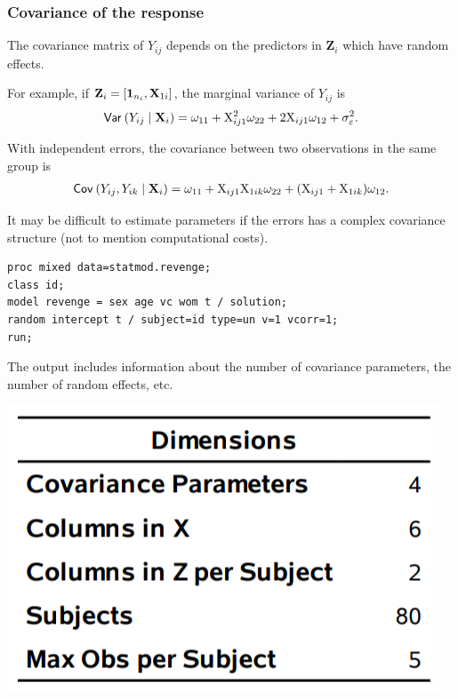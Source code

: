 \documentclass{beamer}
\begin{document}
\begin{frame}
\frametitle{Covariance of the response}
\bi
\item The covariance matrix of $Y_{ij}$ depends on the predictors in $\mathbf{Z}_i$ which have random effects.
\item For example, if $\mathbf{Z}_{i} = [\boldsymbol {1}_{n_i}, \mathbf{X}_{1i}]$, the marginal variance of $Y_{ij}$ is
\begin{align*}
{\mathsf{Var}_{}}\left(Y_{ij}\mid \mathbf{X}_i\right)=\omega_{11}+\mathrm{X}_{ij1}^2 \omega_{22} + 2\mathrm{X}_{ij1} \omega_{12}+\sigma^2_{\varepsilon}.
\end{align*}
\item With independent errors, the covariance between two observations in the same group is
\begin{align*}
{\mathsf{Cov}_{}}\left(Y_{ij}, Y_{ik}\mid \mathbf{X}_i\right)=\omega_{11}+\mathrm{X}_{ij1}\mathrm{X}_{1ik}\omega_{22}+(\mathrm{X}_{ij1}+\mathrm{X}_{1ik})\omega_{12}.
\end{align*}
\item It may be difficult to estimate parameters if the errors has a complex covariance structure (not to mention computational costs).
\ei
\end{frame}

\begin{frame}[fragile]
\begin{tcolorbox}[colback=white, colframe=hecblue, title=\SASlang{} code for random slope model]
\begin{verbatim}
proc mixed data=statmod.revenge;
class id;
model revenge = sex age vc wom t / solution;
random intercept t / subject=id type=un v=1 vcorr=1;
run;
\end{verbatim}
\end{tcolorbox}
The output includes information about the number of covariance parameters, the number of random effects, etc.
\begin{center}
\includegraphics[width = 0.35\linewidth]{img/c6/slides7-e23}
\end{center}
\end{frame}
%  
\end{document}
